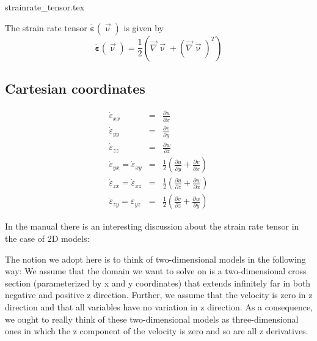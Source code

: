 \begin{flushright} {\tiny {\color{gray} strainrate\_tensor.tex}} \end{flushright}


The strain rate tensor $\dot{\bm\varepsilon}(\vec\upnu)$ is given by
\begin{equation}
\dot{\bm \varepsilon}({\vec \upnu}) 
= \frac{1}{2} \left( {\vec \nabla}{\vec \upnu}+ ({\vec \nabla}{\vec \upnu})^T \right) 
\end{equation}

\subsection{Cartesian coordinates}
\begin{eqnarray}
\dot\varepsilon_{xx} &=& \frac{\partial u}{\partial x} \\
\dot\varepsilon_{yy} &=& \frac{\partial v}{\partial y} \\
\dot\varepsilon_{zz} &=& \frac{\partial w}{\partial z} \\
\dot\varepsilon_{yx} =
\dot\varepsilon_{xy} &=& \frac{1}{2} \left( \frac{\partial u}{\partial y} + \frac{\partial v}{\partial x}  \right)\\
\dot\varepsilon_{zx} =
\dot\varepsilon_{xz} &=& \frac{1}{2} \left( \frac{\partial u}{\partial z} + \frac{\partial w}{\partial x}  \right)\\
\dot\varepsilon_{zy} =
\dot\varepsilon_{yz} &=& \frac{1}{2} \left( \frac{\partial v}{\partial z} + \frac{\partial w}{\partial y}  \right)
\end{eqnarray}

In the \aspect manual there is an interesting discussion about the strain rate tensor in the case of 
2D models: 
\begin{displayquote}
{\color{darkgray}
The notion we adopt here is to think of two-dimensional models in the following way: 
We assume that the domain we want to solve on is a two-dimensional
cross section (parameterized by x and y coordinates) that extends infinitely far in both negative and positive
z direction. Further, we assume that the velocity is zero in z direction and that all variables have no
variation in z direction. As a consequence, we ought to really think of these two-dimensional models as
three-dimensional ones in which the z component of the velocity is zero and so are all z derivatives.}
\end{displayquote}


